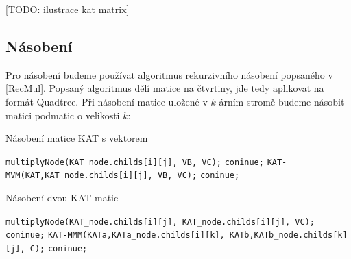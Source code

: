 [TODO: ilustrace kat matrix]

\subsection{Násobení}

Pro násobení budeme používat algoritmus rekurzivního násobení popsaného v \ref{RecMul}. Popsaný algoritmus dělí matice na čtvrtiny, jde tedy aplikovat na formát Quadtree. Při násobení matice uložené v $k$-árním stromě budeme násobit matici podmatic o velikosti $k$:

\label{alg:kat-mvm}
\begin{algorithm}[htb]
	\caption{Násobení matice KAT s vektorem}\label{kat-mvm}
	\begin{algorithmic}[1]
						\State \texttt{multiplyNode(KAT\_node.childs[i][j], VB, VC);}
						\State \texttt{coninue;}
					\EndIf
						\State \texttt{KAT-MVM(KAT,KAT\_node.childs[i][j], VB, VC);}
						\State \texttt{coninue;}
					\EndIf
				\EndIf
			\EndFor
		\EndFor
		\EndProcedure
	\end{algorithmic}
\end{algorithm}

\label{alg:kat-mmm}
\begin{algorithm}[htb]
	\caption{Násobení dvou KAT matic}\label{kat-mmm}
	\begin{algorithmic}[1]
							\State \texttt{multiplyNode(KAT\_node.childs[i][j], KAT\_node.childs[i][j], VC);}
							\State \texttt{coninue;}
						\EndIf
							\State \texttt{KAT-MMM(KATa,KATa\_node.childs[i][k], KATb,KATb\_node.childs[k][j], C);}
							\State \texttt{coninue;}
						\EndIf
					\EndIf
				\EndFor
			\EndFor
		\EndFor
		\EndProcedure
	\end{algorithmic}
\end{algorithm}

